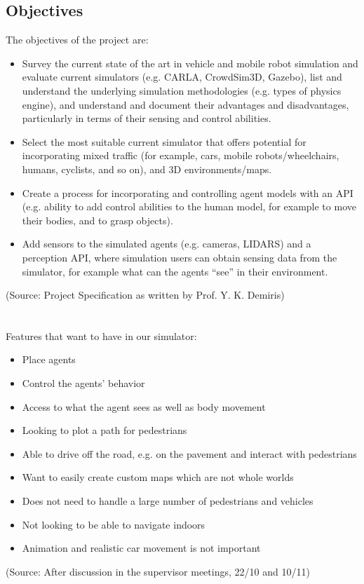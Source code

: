 \subsection{Objectives} \label{Objectives}
The objectives of the project are: 
\begin{itemize}
    \item Survey the current state of the art in vehicle and mobile robot simulation and evaluate current simulators (e.g. CARLA, CrowdSim3D, Gazebo), list and understand the underlying simulation methodologies (e.g. types of physics engine), and understand and document their advantages and disadvantages, particularly in terms of their sensing and control abilities.
    \item Select the most suitable current simulator that offers potential for incorporating mixed traffic (for example, cars, mobile robots/wheelchairs, humans, cyclists, and so on), and 3D environments/maps.
    \item Create a process for incorporating and controlling agent models with an API (e.g. ability to add control abilities to the human model, for example to move their bodies, and to grasp objects).
    \item Add sensors to the simulated agents (e.g. cameras, LIDARS) and a perception API, where simulation users can obtain sensing data from the simulator, for example what can the agents “see” in their environment.
\end{itemize}
(Source: Project Specification as written by Prof. Y. K. Demiris)
\\~\\~\\
Features that want to have in our simulator: 
\begin{itemize}
\item Place agents
\item Control the agents' behavior
\item Access to what the agent sees as well as body movement
\item Looking to plot a path for pedestrians
\item Able to drive off the road, e.g. on the pavement and interact with pedestrians
\item Want to easily create custom maps which are not whole worlds
\item Does not need to handle a large number of pedestrians and vehicles
\item Not looking to be able to navigate indoors
\item Animation and realistic car movement is not important
\end{itemize}
(Source: After discussion in the supervisor meetings, 22/10 and 10/11)
